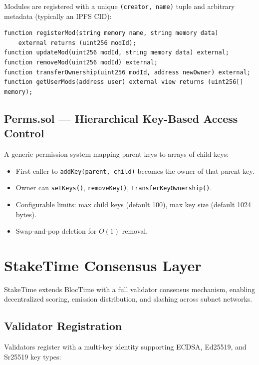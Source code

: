 \documentclass[11pt,a4paper]{article}
\begin{document}
Modules are registered with a unique \texttt{(creator, name)} tuple and arbitrary metadata (typically an IPFS CID):

\begin{lstlisting}[style=solidity]
function registerMod(string memory name, string memory data)
    external returns (uint256 modId);
function updateMod(uint256 modId, string memory data) external;
function removeMod(uint256 modId) external;
function transferOwnership(uint256 modId, address newOwner) external;
function getUserMods(address user) external view returns (uint256[] memory);
\end{lstlisting}

\subsection{Perms.sol --- Hierarchical Key-Based Access Control}

A generic permission system mapping parent keys to arrays of child keys:

\begin{itemize}
    \item First caller to \texttt{addKey(parent, child)} becomes the owner of that parent key.
    \item Owner can \texttt{setKeys()}, \texttt{removeKey()}, \texttt{transferKeyOwnership()}.
    \item Configurable limits: max child keys (default 100), max key size (default 1024 bytes).
    \item Swap-and-pop deletion for $O(1)$ removal.
\end{itemize}

\section{StakeTime Consensus Layer}
\label{sec:staketime}

StakeTime extends BlocTime with a full validator consensus mechanism, enabling decentralized scoring, emission distribution, and slashing across subnet networks.

\subsection{Validator Registration}

Validators register with a multi-key identity supporting ECDSA, Ed25519, and Sr25519 key types:
\end{document}
